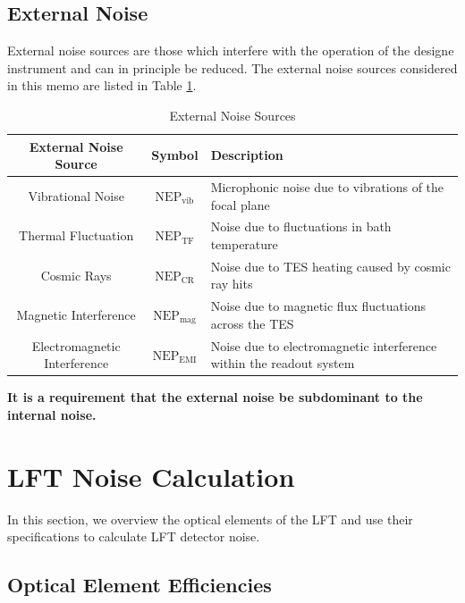 \documentclass[12pt, titlepage]{article} %
\begin{document}

\subsection{External Noise}

External noise sources are those which interfere with the operation of the designe instrument and can in principle be reduced. The external noise sources considered in this memo are listed in Table \ref{table:ExtNoiseSources}. 

\begin{table}[H]
\centering
	\begin{tabularx}{\textwidth}{|| c | c | X ||}
	\hline
	External Noise Source & Symbol & Description \\
	\hline \hline
	Vibrational Noise & $\mathrm{NEP_{vib}}$ & Microphonic noise due to vibrations of the focal plane\\
	\hline
	Thermal Fluctuation & $\mathrm{NEP_{TF}}$ & Noise due to fluctuations in bath temperature \\ 
	\hline
	Cosmic Rays & $\mathrm{NEP_{CR}}$ & Noise due to TES heating caused by cosmic ray hits \\
	\hline
	Magnetic Interference & $\mathrm{NEP_{mag}}$ & Noise due to magnetic flux fluctuations across the TES \\
	\hline
	Electromagnetic Interference & $\mathrm{NEP_{EMI}}$ & Noise due to electromagnetic interference within the readout system  \\
	\hline
	\end{tabularx}
\caption{External Noise Sources \label{table:ExtNoiseSources}}
\end{table}

\textbf{It is a requirement that the external noise be subdominant to the internal noise.}




\section{LFT Noise Calculation}

In this section, we overview the optical elements of the LFT and use their specifications to calculate LFT detector noise. 


\subsection{Optical Element Efficiencies}
\end{document}
